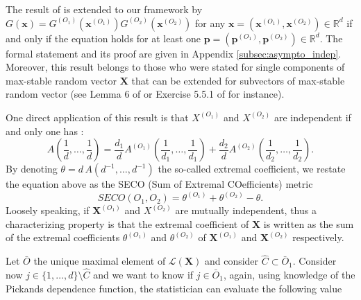 \documentclass[11pt]{article}
\begin{document}
	 The result of \cite{takahashi1994asymptotic} is extended to our framework by $G(\textbf{x}) = G^{(O_1)}(\textbf{x}^{(O_1)}) G^{(O_2)}(\textbf{x}^{(O_2)})$ for any $\textbf{x} = (\textbf{x}^{(O_1)}, \textbf{x}^{(O_2)}) \in \mathbb{R}^d$ if and only if the equation holds for at least one $\textbf{p} = (\textbf{p}^{(O_1)}, \textbf{p}^{(O_2)}) \in \mathbb{R}^d$. The formal statement and its proof are given in Appendix \ref{subsec:asympto_indep}. Moreover, this result belongs to those who were stated for single components of max-stable random vector $\textbf{X}$ that can be extended for subvectors of max-stable random vector (see Lemma 6 of \cite{papastathopoulos2016conditional} or Exercise 5.5.1 of \cite{resnick2008extreme} for instance).
	 
	  One direct application of this result is that $X^{(O_1)}$ and $X^{(O_2)}$ are independent if and only one has :
	\begin{equation*}
		A\left(\frac{1}{d}, \dots, \frac{1}{d}\right) = \frac{d_1}{d} A^{(O_1)}\left( \frac{1}{d_1}, \dots, \frac{1}{d_1} \right) + \frac{d_2}{d} A^{(O_2)}\left( \frac{1}{d_2}, \dots, \frac{1}{d_2} \right).
	\end{equation*}
	By denoting $\theta = d \, A (d^{-1}, \dots, d^{-1})$ the so-called extremal coefficient, we restate the equation above as the SECO (Sum of Extremal COefficients) metric
	\begin{equation}
		SECO(O_1, O_2) = \theta^{(O_1)} + \theta^{(O_2)} - \theta.
	\end{equation}
	Loosely speaking, if $\textbf{X}^{(O_1)}$ and $X^{(O_2)}$ are mutually independent, thus a characterizing property is that the extremal coefficient of $\textbf{X}$ is written as the sum of the extremal coefficients $\theta^{(O_1)}$ and $\theta^{(O_2)}$ of $\textbf{X}^{(O_1)}$ and $\textbf{X}^{(O_2)}$ respectively.
	
	Let $\bar{O}$ the unique maximal element of $\mathcal{L}(\textbf{X})$ and consider $\hat{C} \subset \bar{O}_1$. Consider now $j \in \{1,\dots,d\} \setminus \hat{C}$ and we want to know if $j \in \bar{O}_1$, again, using knowledge of the Pickands dependence function, the statistician can evaluate the following value
	
\end{document}
